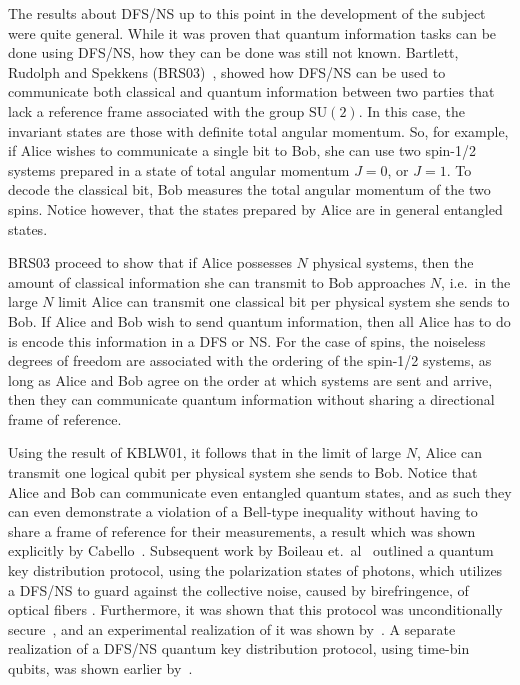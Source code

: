 The results about DFS/NS up to this point in the development of the subject were quite general.   While it was proven that quantum information tasks can be done using DFS/NS, how they can be done was still not known.  Bartlett, Rudolph and Spekkens (BRS03)~\cite{BRS03}, showed how DFS/NS can be used to communicate both classical and quantum information between two parties that lack a reference frame associated with the group $\mathrm{SU}(2)$.  In this case, the invariant states are those with definite total angular momentum.  So, for example, if Alice wishes to communicate a single bit to Bob, she can use two spin-1/2 systems prepared in a state of total angular momentum $J=0$, or $J=1$.  To decode the classical bit, Bob measures the total angular momentum of the two spins.  Notice however, that the states prepared by Alice are in general entangled states.

BRS03 proceed to show that if Alice possesses $N$ physical systems, then the amount of classical information she can transmit to Bob approaches $N$, i.e.~in the large $N$ limit Alice can transmit one classical bit per physical system she sends to Bob.  If Alice and Bob wish to send quantum information, then all Alice has to do is encode this information in a DFS or NS. For the case of spins, the noiseless degrees of freedom are associated with the ordering of the spin-1/2 systems, as long as Alice and Bob agree on the order at which systems are sent and arrive, then they can communicate quantum information without sharing a directional frame of reference.  

Using the result of KBLW01, it follows that in the limit of large $N$, Alice can transmit one logical qubit per physical system she sends to Bob.  Notice that Alice and Bob can communicate even entangled quantum states, and as such they can even demonstrate a violation of a Bell-type inequality without having to share a frame of reference for their measurements, a result which was shown explicitly by Cabello~\cite{C03}.  Subsequent work by Boileau et.~al~\cite{BGLPS04} outlined a quantum key distribution protocol, using the polarization states of photons, which utilizes a DFS/NS to guard against the collective noise, caused by birefringence, of optical fibers . Furthermore, it was shown that this protocol was unconditionally secure~\cite{BTBL05}, and an experimental realization of it was shown by~\cite{CZBJYZYLP06}. A separate realization of a DFS/NS quantum key distribution protocol, using time-bin qubits, was shown earlier by~\cite{WASST03}.  

